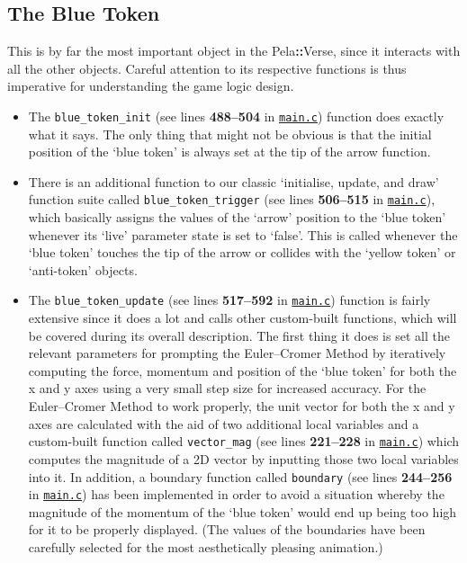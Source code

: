 \documentclass[11pt]{article}
\newcommand{\pelahverse}{Pela\hspace*{1pt}\textbf{::}Verse}
\newcommand{\lineref}[1]{lines \textbf{#1}}
\begin{document}
\subsection{The Blue Token}

This is by far the most important object in the \pelahverse{}, since it interacts with all the other objects. Careful attention to its respective functions is thus imperative for understanding the game logic design.  

\begin{itemize}
    \item The \texttt{blue\_token\_init} (see \lineref{488--504} in \hyperref[app:main-c]{\texttt{main.c}}) function does exactly what it says. The only thing that might not be obvious is that the initial position of the `blue token' is always set at the tip of the arrow function.
    \item There is an additional function to our classic `initialise, update, and draw' function suite called \texttt{blue\_token\_trigger} (see \lineref{506--515} in \hyperref[app:main-c]{\texttt{main.c}}), which basically assigns the values of the `arrow' position to the `blue token' whenever its `live' parameter state is set to `false'. This is called whenever the `blue token' touches the tip of the arrow or collides with the `yellow token' or `anti-token' objects. 
    \item The \texttt{blue\_token\_update} (see \lineref{517--592} in \hyperref[app:main-c]{\texttt{main.c}}) function is fairly extensive since it does a lot and calls other custom-built functions, which will be covered during its overall description. The first thing it does is set all the relevant parameters for prompting the Euler--Cromer Method by iteratively computing the force, momentum and position of the `blue token' for both the x and y axes using a very small step size for increased accuracy. For the Euler--Cromer Method to work properly, the unit vector for both the x and y axes are calculated with the aid of two additional local variables and a custom-built function called \texttt{vector\_mag} (see \lineref{221--228} in \hyperref[app:main-c]{\texttt{main.c}}) which computes the magnitude of a 2D vector by inputting those two local variables into it. In addition, a boundary function called \texttt{boundary} (see \lineref{244--256} in \hyperref[app:main-c]{\texttt{main.c}}) has been implemented in order to avoid a situation whereby the magnitude of the momentum of the `blue token' would end up being too high for it to be properly displayed. (The values of the boundaries have been carefully selected for the most aesthetically pleasing animation.) 

\end{itemize}
\end{document}
